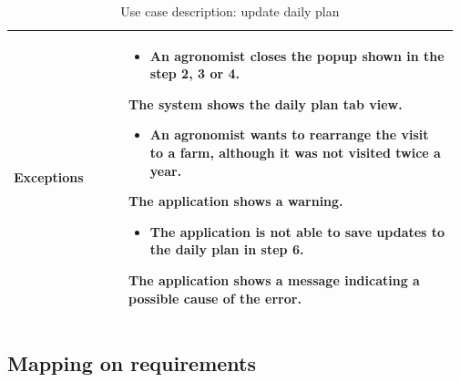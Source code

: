 \begin{table}[H]
\begin{tabular}{@{}p{0.25\linewidth} p{0.72\linewidth}@{}}
		\textbf{Exceptions}         & \begin{itemize}[leftmargin=.4cm,noitemsep,topsep=0pt,before=\vspace{-3mm}]
		   \item An agronomist closes the popup shown in the step 2, 3 or 4.
		\end{itemize}
	    The system shows the daily plan tab view. \begin{itemize}[leftmargin=.4cm,noitemsep,topsep=0pt]
		   \item An agronomist wants to rearrange the visit to a farm, although it was not visited twice a year.
		\end{itemize}
		The application shows a warning.
	    \begin{itemize}[leftmargin=.4cm,noitemsep,topsep=0pt]
		   \item The application is not able to save updates to the daily plan in step 6. 
		\end{itemize}
		The application shows a message indicating a possible cause of the error.
		\\\bottomrule
	\end{tabular}
	\caption{Use case description: update daily plan} 
\end{table}


\subsection{Mapping on requirements}

